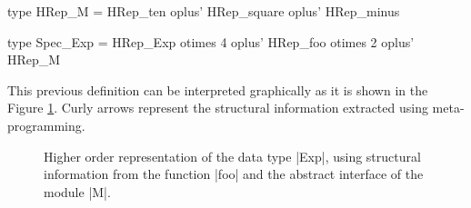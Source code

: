 \begin{code}
type HRep_M  =       HRep_ten
             oplus'  HRep_square
             oplus'  HRep_minus
\end{code}



\begin{code}
type Spec_Exp  =       HRep_Exp  otimes 4
               oplus'  HRep_foo  otimes 2
               oplus'  HRep_M
\end{code}

This previous definition can be interpreted graphically as it is shown in the
Figure \ref{fig:hrep}.
%
Curly arrows represent the structural information extracted using
meta-programming.

\begin{figure}[t]
  \centering
  
  \caption{Higher order representation of the data type |Exp|, using structural
    information from the function |foo| and the abstract interface of the module
    |M|.}
  \label{fig:hrep}
\end{figure}


